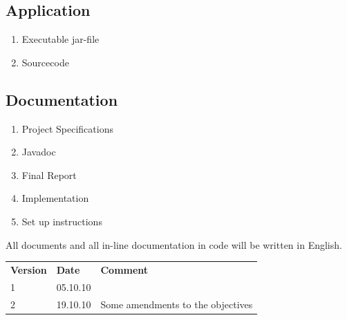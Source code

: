 \documentclass[a4paper,10pt,titlepage]{article}
\begin{document}
\subsection{Application}
\begin{enumerate}
 \item Executable jar-file
 \item Sourcecode
\end{enumerate}

\subsection{Documentation}
\begin{enumerate}
 \item Project Specifications
 \item Javadoc
 \item Final Report
 \item Implementation
 \item Set up instructions
\end{enumerate}

All documents and all in-line documentation in code will be written in English.


\newpage
\begin{tabularx}{\textwidth}{p{2cm} p{2cm} X}
\textbf{Version} & \textbf{Date} & \textbf{Comment}\\
1 & 05.10.10 & \\
2 & 19.10.10 & Some amendments to the objectives\\
\end{tabularx}
\end{document}
